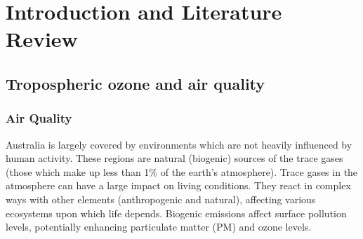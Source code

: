 
%
\chapter{Introduction and Literature Review} %
\label{LR}

\section{Tropospheric ozone and air quality}
  \label{LR:O3andAQ}
  \subsection{Air Quality}
    \label{LR:O3andAQ:AQ}
    Australia is largely covered by environments which are not heavily influenced by human activity.
    These regions are natural (biogenic) sources of the trace gases (those which make up less than 1\% of the earth's atmosphere).
    Trace gases in the atmosphere can have a large impact on living conditions.
    They react in complex ways with other elements (anthropogenic and natural), affecting various ecosystems upon which life depends.
    Biogenic emissions affect surface pollution levels, potentially enhancing particulate matter (PM) and ozone levels.
    
